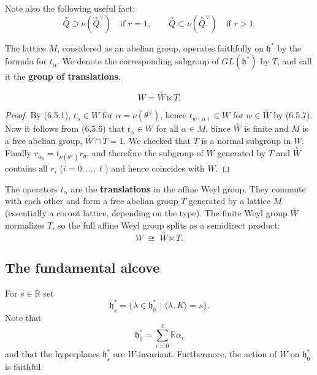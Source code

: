 \documentclass[12pt]{article}
\begin{document}
Note also the following useful fact:
\begin{equation} \label{6.5.9}
    \overset{\circ}{Q} \supset \nu(\overset{\circ}{Q}^\vee) \quad \text{if $r=1$},
    \qquad
    \overset{\circ}{Q} \subset \nu(\overset{\circ}{Q}^\vee) \quad \text{if $r>1$}.
\end{equation}

The lattice $M$, considered as an abelian group, operates faithfully on $\mathfrak{h}^*$ by the formula for $t_\alpha$. We denote the corresponding subgroup of $GL(\mathfrak{h}^*)$ by $T$, and call it the \textbf{group of translations}.

\begin{proposition}[6.5]
    \[
        W = \overset{\circ}{W} \ltimes T.
    \]
\end{proposition}

\begin{proof}
    By (6.5.1), $t_\alpha \in W$ for $\alpha = \nu(\theta^\vee)$, hence
    $t_{w(\alpha)} \in W$ for $w \in \overset{\circ}{W}$ by (6.5.7). Now it follows from (6.5.6) that
    $t_\alpha \in W$ for all $\alpha \in M$. Since $\overset{\circ}{W}$ is finite and $M$ is a free abelian
    group, $\overset{\circ}{W} \cap T = 1$. We checked that $T$ is a normal subgroup in $W$. Finally $r_{\alpha_0} = t_{\nu(\theta^\vee)} r_\theta$, and therefore the subgroup of $W$
    generated by $T$ and $\overset{\circ}{W}$ contains all $r_i$ ($i=0,\dots,\ell$) and hence coincides
    with $W$.
\end{proof}


\begin{remark}
    The operators $t_\alpha$ are the \textbf{translations} in the affine Weyl group. They commute with each other and form a free abelian group $T$ generated by a lattice $M$ (essentially a coroot lattice, depending on the type). The finite Weyl group $\overset{\circ}{W}$ normalizes $T$, so the full affine Weyl group  splits as a semidirect product:
    \[
        W \;\cong\; \overset{\circ}{W} \ltimes T.
    \]
\end{remark}

\subsection{The fundamental alcove}
For $s \in \mathbb{R}$ set
\[
    \mathfrak{h}^*_s = \{\lambda \in \mathfrak{h}^*_\mathbb{R} \mid \langle \lambda, K\rangle = s\}.
\]
Note that
\[
    \mathfrak{h}^*_0 = \sum_{i=0}^\ell \mathbb{R}\alpha_i
\]
and that the hyperplanes $\mathfrak{h}^*_s$ are $W$-invariant. Furthermore, the action of $W$ on $\mathfrak{h}^*_0$ is faithful.
\end{document}
